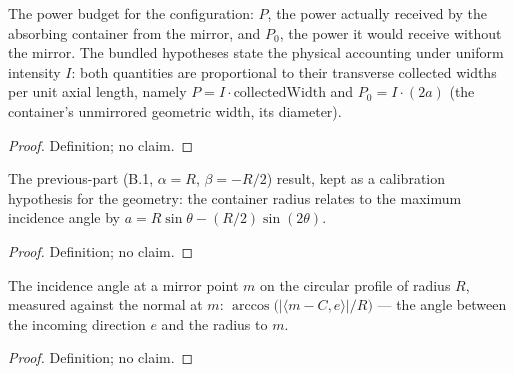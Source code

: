 \begin{definition}
\label{def:IPhO2026Problems_problem_IPhO_2026_2_B_2:PowerBudget}
The power budget for the configuration: $P$, the power actually received by
the absorbing container from the mirror, and $P_0$, the power it would
receive without the mirror.  The bundled hypotheses state the physical
accounting under uniform intensity $I$: both quantities are proportional to
their transverse collected widths per unit axial length, namely
$P = I \cdot \mathrm{collectedWidth}$ and $P_0 = I \cdot (2a)$ (the
container's unmirrored geometric width, its diameter).
\end{definition}
\begin{proof}
Definition; no claim.
\end{proof}

\begin{definition}[B.1 calibration]
\label{def:IPhO2026Problems_problem_IPhO_2026_2_B_2:B1Calibration}
The previous-part (B.1, $\alpha = R$, $\beta = -R/2$) result, kept as a
calibration hypothesis for the geometry: the container radius relates to
the maximum incidence angle by
$a = R \sin\theta - (R/2) \sin(2\theta)$.
\end{definition}
\begin{proof}
Definition; no claim.
\end{proof}

\begin{definition}
\label{def:IPhO2026Problems_problem_IPhO_2026_2_B_2:incidenceAngle}
The incidence angle at a mirror point $m$ on the circular profile of
radius $R$, measured against the normal at $m$:
$\arccos\bigl(|\langle m - C, e\rangle| / R\bigr)$ --- the angle
between the incoming direction $e$ and the radius to $m$.
\end{definition}
\begin{proof}
Definition; no claim.
\end{proof}

